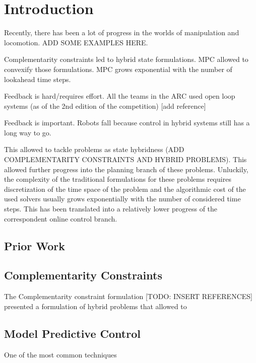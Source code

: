 \documentclass[12,twoside]{TFG-GM}
\theoremstyle{definition}
\theoremstyle{remark}
\begin{document}
\maketitle

\section{Introduction}
\label{sec:intro}
Recently, there has been a lot of progress in the worlds of manipulation and locomotion. ADD SOME EXAMPLES HERE.

Complementarity constraints led to hybrid state formulations. MPC allowed to convexify those formulations. MPC grows exponential with the number of  lookahead time steps.

Feedback is hard/requires effort. All the teams in the ARC used open loop systems (as of the 2nd edition of the competition) [add reference]

Feedback is important. Robots fall because control in hybrid systems still has a long way to go.


This allowed to tackle problems as state hybridness (ADD COMPLEMENTARITY CONSTRAINTS AND HYBRID PROBLEMS). This allowed further progress into the planning branch of these problems. Unluckily, the complexity of the traditional formulations for these problems requires discretization of the time space of the problem and the algorithmic cost of the used solvers usually grows exponentially with the number of considered time steps. This has been translated into a relatively lower progress of the correspondent online control branch.

\subsection{Prior Work}
\label{subsec:priorWork}

\subsection{Complementarity Constraints}
\label{subsec:Complementarity Constraint}
The Complementarity constraint formulation [TODO: INSERT REFERENCES] presented a formulation of hybrid problems that allowed to 

\subsection{Model Predictive Control}
\label{subsec:MPC}
One of the most common techniques 
\end{document}
